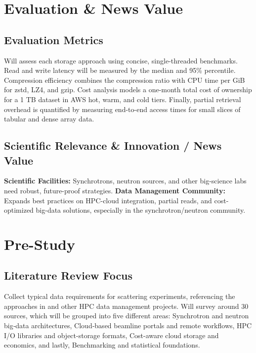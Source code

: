 \documentclass{article}
\begin{document}
\section{Evaluation \& News Value}

\subsection{Evaluation Metrics}
Will assess each storage approach using concise, single-threaded benchmarks. Read and write latency will be measured by the median and 95\% percentile. Compression efficiency combines the compression ratio with CPU time per GiB for zstd, LZ4, and gzip. Cost analysis models a one-month total cost of ownership for a 1 TB dataset in AWS hot, warm, and cold tiers. Finally, partial retrieval overhead is quantified by measuring end-to-end access times for small slices of tabular and dense array data. 

\subsection{Scientific Relevance \& Innovation / News Value}
\textbf{Scientific Facilities:} Synchrotrons, neutron sources, and other big-science labs need robust, future-proof strategies. \textbf{Data Management Community:} Expands best practices on HPC-cloud integration, partial reads, and cost-optimized big-data solutions, especially in the synchrotron/neutron community.




\section{Pre-Study}

\subsection{Literature Review Focus}
Collect typical data requirements for scattering experiments, referencing the approaches in \cite{wang2018synchrotron, meyer2014store, moriyama2019public, godoy2021efficient} and other HPC data management projects. Will survey around 30 sources, which will be grouped into five different areas: Synchrotron and neutron big‐data architectures, Cloud‐based beamline portals and remote workflows, HPC I/O libraries and object-storage formats, Cost-aware cloud storage and economics, and lastly, Benchmarking and statistical foundations.
\end{document}
